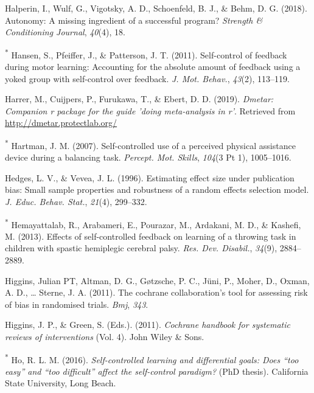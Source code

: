 \documentclass[
  english,
  man, donotrepeattitle,floatsintext]{apa7}
\newlength{\cslhangindent}
\newlength{\cslentryspacingunit} %
\newenvironment{CSLReferences}[2] %
 {%
  \setlength{\parindent}{0pt}
  \ifodd #1
  \let\oldpar\par
  \def\par{\hangindent=\cslhangindent\oldpar}
  \fi
  \setlength{\parskip}{#2\cslentryspacingunit}
 }%
 {}
\begin{document}
\begin{CSLReferences}{1}{0}
\leavevmode{}%
Halperin, I., Wulf, G., Vigotsky, A. D., Schoenfeld, B. J., \& Behm, D. G. (2018). Autonomy: A missing ingredient of a successful program? \emph{Strength \& Conditioning Journal}, \emph{40}(4), 18.

\leavevmode{}%
\textsuperscript{*} Hansen, S., Pfeiffer, J., \& Patterson, J. T. (2011). Self-control of feedback during motor learning: Accounting for the absolute amount of feedback using a yoked group with self-control over feedback. \emph{J. Mot. Behav.}, \emph{43}(2), 113--119.

\leavevmode{}%
Harrer, M., Cuijpers, P., Furukawa, T., \& Ebert, D. D. (2019). \emph{Dmetar: Companion r package for the guide 'doing meta-analysis in r'}. Retrieved from \url{http://dmetar.protectlab.org/}

\leavevmode{}%
\textsuperscript{*} Hartman, J. M. (2007). Self-controlled use of a perceived physical assistance device during a balancing task. \emph{Percept. Mot. Skills}, \emph{104}(3 Pt 1), 1005--1016.

\leavevmode{}%
Hedges, L. V., \& Vevea, J. L. (1996). Estimating effect size under publication bias: Small sample properties and robustness of a random effects selection model. \emph{J. Educ. Behav. Stat.}, \emph{21}(4), 299--332.

\leavevmode{}%
\textsuperscript{*} Hemayattalab, R., Arabameri, E., Pourazar, M., Ardakani, M. D., \& Kashefi, M. (2013). Effects of self-controlled feedback on learning of a throwing task in children with spastic hemiplegic cerebral palsy. \emph{Res. Dev. Disabil.}, \emph{34}(9), 2884--2889.

\leavevmode{}%
Higgins, Julian PT, Altman, D. G., Gøtzsche, P. C., Jüni, P., Moher, D., Oxman, A. D., \ldots{} Sterne, J. A. (2011). The cochrane collaboration's tool for assessing risk of bias in randomised trials. \emph{Bmj}, \emph{343}.

\leavevmode{}%
Higgins, J. P., \& Green, S. (Eds.). (2011). \emph{Cochrane handbook for systematic reviews of interventions} (Vol. 4). John Wiley \& Sons.

\leavevmode{}%
\textsuperscript{*} Ho, R. L. M. (2016). \emph{Self-controlled learning and differential goals: Does {``too easy''} and {``too difficult''} affect the self-control paradigm?} (PhD thesis). California State University, Long Beach.


\end{CSLReferences}
\end{document}
